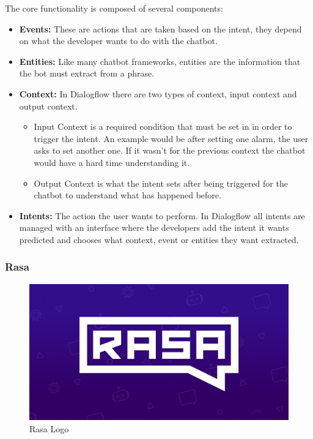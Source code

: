 The core functionality is composed of several components:\\
\begin{itemize}
	\item {\textbf{Events:} These are actions that are taken based on the intent, they depend on what the developer wants to do with the chatbot.}
	\item {\textbf{Entities:} Like many chatbot frameworks, entities are the information that the bot must extract from a phrase.}
	\item {\textbf{Context:} In Dialogflow there are two types of context, input context and output context.\\
			\begin{itemize}
				\item {Input Context is a required condition that must be set in in order to trigger the intent. An example would be after setting one alarm, the user asks to set another one. If it wasn’t for the previous context the chatbot would have a hard time understanding it.}
				\item {Output Context is what the intent sets after being triggered for the chatbot to understand what has happened before.}
			\end{itemize}
			}
	\item {\textbf{Intents:} The action the user wants to perform. In Dialogflow all intents are managed with an interface where the developers add the intent it wants predicted and chooses what context, event or entities they want extracted.}
\end{itemize}


\subsubsection{Rasa}\label{sec:chap3_rasa}

\begin{center}
	\begin{figure}[h!]
		\centering
		\includegraphics[scale=0.3]{./images/3-rasa-log}
		\caption{Rasa Logo}
		\label{rasa_logo}
	\end{figure}
\end{center}


